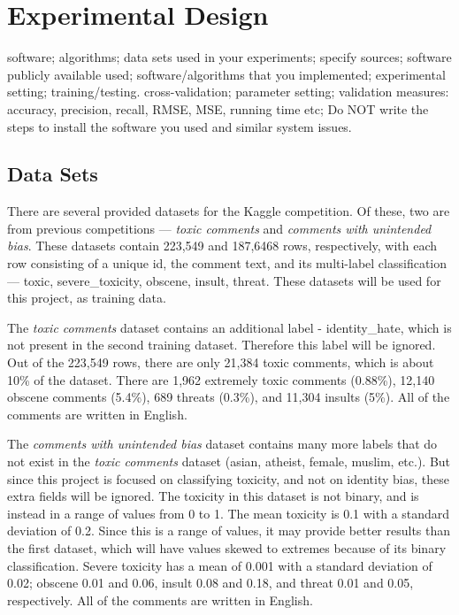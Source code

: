 \documentclass{article}
\begin{document}
\section{Experimental Design}

software; algorithms; data sets used in
your experiments; specify sources; software publicly available
used; software/algorithms that you implemented; experimental
setting; training/testing. cross-validation; parameter setting;
validation measures: accuracy, precision, recall, RMSE, MSE,
running time etc; Do NOT write the steps to install the
software you used and similar system issues.

\subsection{Data Sets}

There are several provided datasets for the Kaggle competition. Of these, two are from previous competitions --- \textit{toxic comments} and \textit{comments with unintended bias}. These datasets contain 223,549 and 187,6468 rows, respectively, with each row consisting of a unique id, the comment text, and its multi-label classification --- toxic, severe\_toxicity, obscene, insult, threat. These datasets will be used for this project, as training data.

The \textit{toxic comments} dataset contains an additional label - identity\_hate, which is not present in the second training dataset. Therefore this label will be ignored. Out of the 223,549 rows, there are only 21,384 toxic comments, which is about 10\% of the dataset. There are 1,962 extremely toxic comments (0.88\%), 12,140 obscene comments (5.4\%), 689 threats (0.3\%), and 11,304 insults (5\%). All of the comments are written in English.

The \textit{comments with unintended bias} dataset contains many more labels that do not exist in the \textit{toxic comments} dataset (asian, atheist, female, muslim, etc.). But since this project is focused on classifying toxicity, and not on identity bias, these extra fields will be ignored. The toxicity in this dataset is not binary, and is instead in a range of values from 0 to 1. The mean toxicity is 0.1 with a standard deviation of 0.2. Since this is a range of values, it may provide better results than the first dataset, which will have values skewed to extremes because of its binary classification. Severe toxicity has a mean of 0.001 with a standard deviation of 0.02; obscene 0.01 and 0.06, insult 0.08 and 0.18, and threat 0.01 and 0.05, respectively. All of the comments are written in English.
\end{document}

